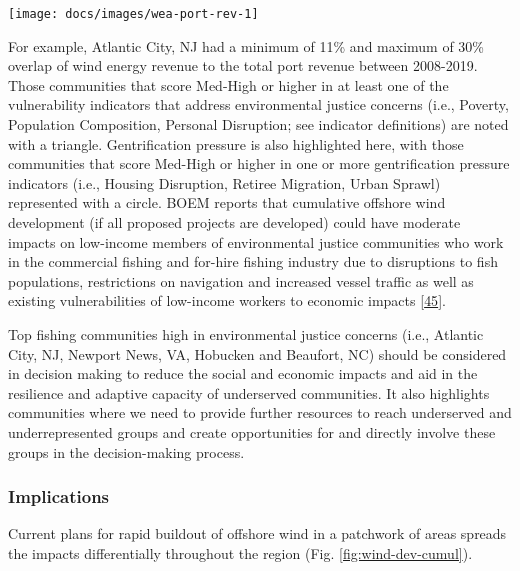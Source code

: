 \documentclass[
  10pt,
]{article}
\let\origfigure\figure
\let\endorigfigure\endfigure
\renewenvironment{figure}[1][2] {
    \expandafter\origfigure\expandafter[H]
} {
    \endorigfigure
}
\begin{document}
\begin{figure}

{\centering \texttt{[image: docs/images/wea-port-rev-1]} 

}

\caption{Percent of port revenue from Wind Energy Areas(WEA) in descending order of most to least port revenue from WEA.}\label{fig:wea-port-rev}
\end{figure}

For example, Atlantic City, NJ had a minimum of 11\% and maximum of 30\%
overlap of wind energy revenue to the total port revenue between
2008-2019. Those communities that score Med-High or higher in at least
one of the vulnerability indicators that address environmental justice
concerns (i.e., Poverty, Population Composition, Personal Disruption;
see indicator definitions) are noted with a triangle. Gentrification
pressure is also highlighted here, with those communities that score
Med-High or higher in one or more gentrification pressure indicators
(i.e., Housing Disruption, Retiree Migration, Urban Sprawl) represented
with a circle. BOEM reports that cumulative offshore wind development
(if all proposed projects are developed) could have moderate impacts on
low-income members of environmental justice communities who work in the
commercial fishing and for-hire fishing industry due to disruptions to
fish populations, restrictions on navigation and increased vessel
traffic as well as existing vulnerabilities of low-income workers to
economic impacts {[}\protect\hyperlink{ref-boem_vineyard_2020}{45}{]}.

Top fishing communities high in environmental justice concerns (i.e.,
Atlantic City, NJ, Newport News, VA, Hobucken and Beaufort, NC) should
be considered in decision making to reduce the social and economic
impacts and aid in the resilience and adaptive capacity of underserved
communities. It also highlights communities where we need to provide
further resources to reach underserved and underrepresented groups and
create opportunities for and directly involve these groups in the
decision-making process.

\hypertarget{implications-7}{%
\subsubsection{Implications}\label{implications-7}}

Current plans for rapid buildout of offshore wind in a patchwork of
areas spreads the impacts differentially throughout the region (Fig.
\ref{fig:wind-dev-cumul}).
\end{document}
